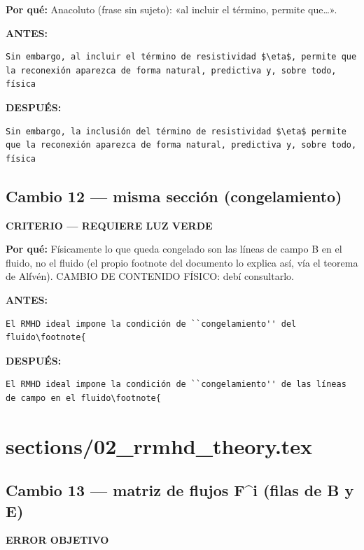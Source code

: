 \documentclass[11pt,a4paper]{article}
\begin{document}
\textbf{Por qué:} Anacoluto (frase sin sujeto): «al incluir el término, permite que…».

\textcolor{antesline}{\textbf{ANTES:}}
\begin{Verbatim}[breaklines=true, breakanywhere=true, fontsize=\small, frame=leftline, rulecolor=\color{antesline}, framerule=1.2pt]
Sin embargo, al incluir el término de resistividad $\eta$, permite que la reconexión aparezca de forma natural, predictiva y, sobre todo, física
\end{Verbatim}
\textcolor{despline}{\textbf{DESPUÉS:}}
\begin{Verbatim}[breaklines=true, breakanywhere=true, fontsize=\small, frame=leftline, rulecolor=\color{despline}, framerule=1.2pt]
Sin embargo, la inclusión del término de resistividad $\eta$ permite que la reconexión aparezca de forma natural, predictiva y, sobre todo, física
\end{Verbatim}

\subsection*{Cambio 12 --- misma sección (congelamiento)}
\colorbox{critbg}{\textbf{\footnotesize CRITERIO --- REQUIERE LUZ VERDE}}

\textbf{Por qué:} Físicamente lo que queda congelado son las líneas de campo B en el fluido, no el fluido (el propio footnote del documento lo explica así, vía el teorema de Alfvén). CAMBIO DE CONTENIDO FÍSICO: debí consultarlo.

\textcolor{antesline}{\textbf{ANTES:}}
\begin{Verbatim}[breaklines=true, breakanywhere=true, fontsize=\small, frame=leftline, rulecolor=\color{antesline}, framerule=1.2pt]
El RMHD ideal impone la condición de ``congelamiento'' del fluido\footnote{
\end{Verbatim}
\textcolor{despline}{\textbf{DESPUÉS:}}
\begin{Verbatim}[breaklines=true, breakanywhere=true, fontsize=\small, frame=leftline, rulecolor=\color{despline}, framerule=1.2pt]
El RMHD ideal impone la condición de ``congelamiento'' de las líneas de campo en el fluido\footnote{
\end{Verbatim}


\section*{sections/02\_rrmhd\_theory.tex}
\subsection*{Cambio 13 --- matriz de flujos F\textasciicircum{}i (filas de B y E)}
\colorbox{okbg}{\textbf{\footnotesize ERROR OBJETIVO}}
\end{document}
